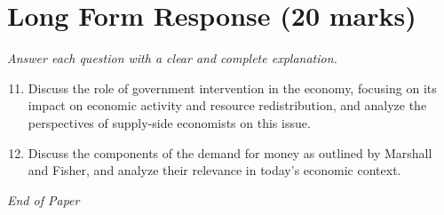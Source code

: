 \documentclass[12pt]{article}
\begin{document}
\section*{Long Form Response (20 marks)}
\textit{Answer each question with a clear and complete explanation.}
\begin{enumerate}[label=\arabic*.]
\setcounter{enumi}{10}
\item Discuss the role of government intervention in the economy, focusing on its impact on economic activity and resource redistribution, and analyze the perspectives of supply-side economists on this issue.
\item Discuss the components of the demand for money as outlined by Marshall and Fisher, and analyze their relevance in today's economic context.
\end{enumerate}

\vfill
\noindent\textit{End of Paper}
\end{document}
